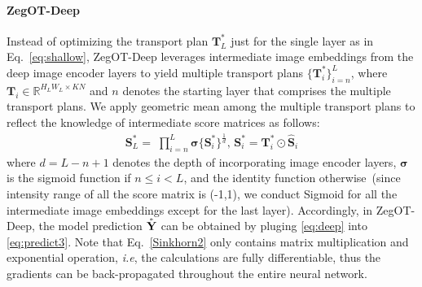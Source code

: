 \documentclass[nohyperref]{article}
\newcommand{\bs}{\boldsymbol}
\newcommand{\asty}{\accentset{\ast}{\mathbf{Y}}}
\theoremstyle{plain}
\theoremstyle{definition}
\theoremstyle{remark}
\begin{document}
\paragraph{ZegOT-Deep}
Instead of optimizing the transport plan $\bs{T}^{\ast}_L$ just for the single layer as in Eq.~\eqref{eq:shallow},  ZegOT-Deep leverages intermediate image embeddings from the deep image encoder layers  to yield multiple
transport plans $\{\bs{T}^{\ast}_i\}_{i=n}^L$,
where $\bs{T}_i \in \mathbb{R}^{H_LW_L \times K N}$ and $n$ denotes the starting layer that comprises the multiple transport plans.
We apply geometric mean among the multiple transport plans to reflect the knowledge of intermediate score matrices as follows: 
\begin{eqnarray}
\bs{S}^{\ast}_L = \; \prod^{L}_{i=n} \bs{\sigma}\{\bs{S}^{\ast}_i\}^{\frac{1}{d}}, \, \bs{S}^{\ast}_i= \bs{T}^{\ast}_i \odot\bs{\hat S}_i
\label{eq:deep}
\end{eqnarray}
where $d = L - n + 1$ denotes the depth of incorporating image encoder layers, $\bs{\sigma}$ is the sigmoid function if $n\leq i<L$, and the identity function otherwise~(since intensity range of all the score matrix is (-1,1), we conduct Sigmoid for all the intermediate image embeddings except for the last layer).
Accordingly, in ZegOT-Deep, the model prediction $\asty$ can be obtained by pluging \eqref{eq:deep} into \eqref{eq:predict3}.
Note that Eq.~\eqref{Sinkhorn2} only contains matrix multiplication and exponential operation, \textit{i.e}, the calculations are fully differentiable, thus the gradients can be back-propagated throughout the entire neural network. 


\end{document}
